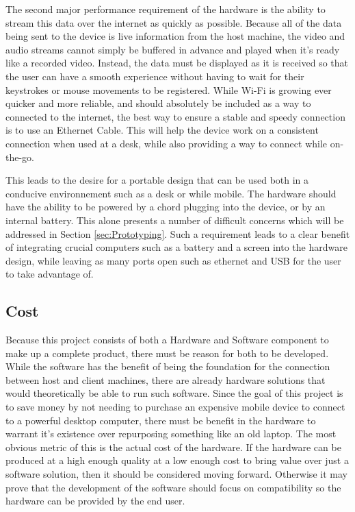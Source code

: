 The second major performance requirement of the hardware is the ability to stream this data over the internet as quickly as possible.
Because all of the data being sent to the device is live information from the host machine, the video and audio streams cannot simply be buffered in advance and played when it's ready like a recorded video.
Instead, the data must be displayed as it is received so that the user can have a smooth experience without having to wait for their keystrokes or mouse movements to be registered.
While Wi-Fi is growing ever quicker and more reliable, and should absolutely be included as a way to connected to the internet, the best way to ensure a stable and speedy connection is to use an Ethernet Cable.
This will help the device work on a consistent connection when used at a desk, while also providing a way to connect while on-the-go.

This leads to the desire for a portable design that can be used both in a conducive environnement such as a desk or while mobile.
The hardware should have the ability to be powered by a chord plugging into the device, or by an internal battery.
This alone presents a number of difficult concerns which will be addressed in Section \ref{sec:Prototyping}.
Such a requirement leads to a clear benefit of integrating crucial computers such as a battery and a screen into the hardware design, while leaving as many ports open such as ethernet and USB for the user to take advantage of.


\subsection{Cost}\label{subsec:HardwareCost}

Because this project consists of both a Hardware and Software component to make up a complete product, there must be reason for both to be developed.
While the software has the benefit of being the foundation for the connection between host and client machines, there are already hardware solutions that would theoretically be able to run such software.
Since the goal of this project is to save money by not needing to purchase an expensive mobile device to connect to a powerful desktop computer, there must be benefit in the hardware to warrant it's existence over repurposing something like an old laptop.
The most obvious metric of this is the actual cost of the hardware.
If the hardware can be produced at a high enough quality at a low enough cost to bring value over just a software solution, then it should be considered moving forward.
Otherwise it may prove that the development of the software should focus on compatibility so the hardware can be provided by the end user.

